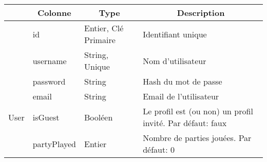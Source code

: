 \begin{longtable}[c]{@{}|p{}|p{}|p{}|p{}|@{}}
	\rowcolor{ccPurple} 
	\multicolumn{1}{c|}{Table} & \multicolumn{1}{c|}{Colonne} & \multicolumn{1}{c}{Type}                                        & \multicolumn{1}{c|}{Description}                                 \\
	\endhead
														& id                                                   & Entier, Clé Primaire                                                                     & Identifiant unique                                                                       \\* \cmidrule(l){2-4} 
														& username                                             & String, Unique                                                                           & Nom d’utilisateur                                                                        \\* \cmidrule(l){2-4} 
														& password                                             & String                                                                                   & Hash du mot de passe                                                                     \\* \cmidrule(l){2-4} 
														& email                                                & String                                                                                   & Email de l’utilisateur                                                                   \\* \cmidrule(l){2-4} 
	\multirow{-5}{*}{User}								& isGuest                                              & Booléen                                                                                  & Le profil est (ou non) un profil invité. Par défaut: faux                                \\* \cmidrule(l){2-4} 
							                            & partyPlayed                                          & Entier                                                                                   & Nombre de parties jouées. Par défaut: 0                                                  \\* \midrule

\end{longtable}
